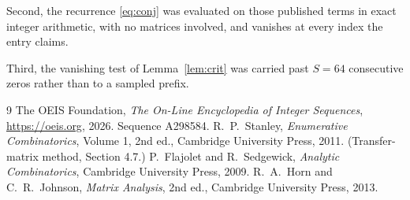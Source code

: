 \documentclass[11pt,a4paper]{article}
\theoremstyle{plain}
\theoremstyle{definition}
\begin{document}
Second, the recurrence \eqref{eq:conj} was evaluated on those published terms in exact
integer arithmetic, with no matrices involved, and vanishes at every index the entry claims.

Third, the vanishing test of Lemma~\ref{lem:crit} was carried past $S=64$ consecutive
zeros rather than to a sampled prefix.

\begin{thebibliography}{9}
 The OEIS Foundation, \emph{The On-Line Encyclopedia of Integer
Sequences}, \url{https://oeis.org}, 2026. Sequence A298584.
 R.~P.~Stanley, \emph{Enumerative Combinatorics}, Volume 1, 2nd ed.,
Cambridge University Press, 2011. (Transfer-matrix method, Section 4.7.)
 P.~Flajolet and R.~Sedgewick, \emph{Analytic Combinatorics}, Cambridge
University Press, 2009.
 R.~A.~Horn and C.~R.~Johnson, \emph{Matrix Analysis}, 2nd ed., Cambridge
University Press, 2013.
\end{thebibliography}
\end{document}
